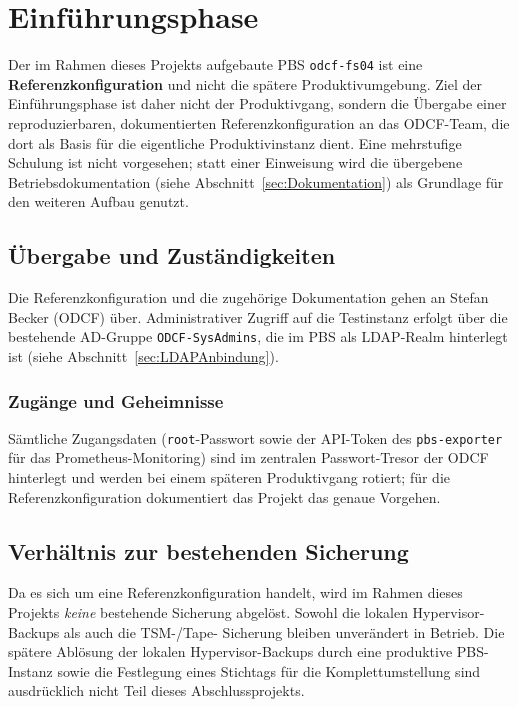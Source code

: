 \section{Einführungsphase}
\label{sec:Einfuehrungsphase}

Der im Rahmen dieses Projekts aufgebaute \ac{PBS} \texttt{odcf-fs04}
ist eine \textbf{Referenzkonfiguration} und nicht die spätere
Produktivumgebung. Ziel der Einführungsphase ist daher nicht der
Produktivgang, sondern die Übergabe einer reproduzierbaren,
dokumentierten Referenzkonfiguration an das \ac{ODCF}-Team, die
dort als Basis für die eigentliche Produktivinstanz dient.
Eine mehrstufige Schulung ist nicht vorgesehen; statt einer
Einweisung wird die übergebene Betriebsdokumentation
(siehe Abschnitt~\ref{sec:Dokumentation}) als Grundlage für den
weiteren Aufbau genutzt.

\subsection{Übergabe und Zuständigkeiten}
Die Referenzkonfiguration und die zugehörige Dokumentation gehen an
Stefan Becker (\ac{ODCF}) über. Administrativer Zugriff auf die
Testinstanz erfolgt über die bestehende \ac{AD}-Gruppe
\texttt{ODCF-SysAdmins}, die im \ac{PBS} als \ac{LDAP}-Realm
hinterlegt ist (siehe Abschnitt~\ref{sec:LDAPAnbindung}).

\subsubsection*{Zugänge und Geheimnisse}
Sämtliche Zugangsdaten (\texttt{root}-Passwort sowie der
\ac{API}-Token des \texttt{pbs-exporter} für das
Prometheus-Monitoring) sind im zentralen Passwort-Tresor
der \ac{ODCF} hinterlegt und werden bei einem späteren
Produktivgang rotiert; für die Referenzkonfiguration
dokumentiert das Projekt das genaue Vorgehen.

\subsection{Verhältnis zur bestehenden Sicherung}
Da es sich um eine Referenzkonfiguration handelt, wird im Rahmen
dieses Projekts \emph{keine} bestehende Sicherung abgelöst.
Sowohl die lokalen Hypervisor-Backups als auch die \ac{TSM}-/Tape-
Sicherung bleiben unverändert in Betrieb.
Die spätere Ablösung der lokalen Hypervisor-Backups durch eine
produktive \ac{PBS}-Instanz sowie die Festlegung eines Stichtags
für die Komplettumstellung sind ausdrücklich nicht Teil dieses
Abschlussprojekts.
